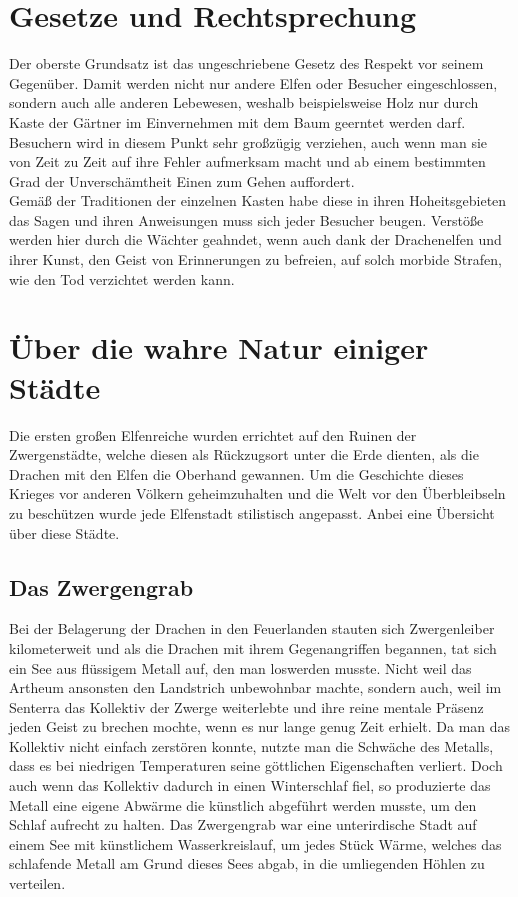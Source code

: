 \documentclass[a4paper,12pt,oneside]{book}
\begin{document}
\chapter{Gesetze und Rechtsprechung}
Der oberste Grundsatz ist das ungeschriebene Gesetz des Respekt vor seinem Gegenüber. Damit werden nicht nur andere Elfen oder Besucher eingeschlossen, sondern auch alle anderen Lebewesen, weshalb beispielsweise Holz nur durch Kaste der Gärtner im Einvernehmen mit dem Baum geerntet werden darf. Besuchern wird in diesem Punkt sehr großzügig verziehen, auch wenn man sie von Zeit zu Zeit auf ihre Fehler aufmerksam macht und ab einem bestimmten Grad der Unverschämtheit Einen zum Gehen auffordert. 
\\Gemäß der Traditionen der einzelnen Kasten habe diese in ihren Hoheitsgebieten das Sagen und ihren Anweisungen muss sich jeder Besucher beugen. Verstöße werden hier durch die Wächter geahndet, wenn auch dank der Drachenelfen und ihrer Kunst, den Geist von Erinnerungen zu befreien, auf solch morbide Strafen, wie den Tod verzichtet werden kann.
\chapter{Über die wahre Natur einiger Städte}
Die ersten großen Elfenreiche wurden errichtet auf den Ruinen der Zwergenstädte, welche diesen als Rückzugsort unter die Erde dienten, als die Drachen mit den Elfen die Oberhand gewannen. Um die Geschichte dieses Krieges vor anderen Völkern geheimzuhalten und die Welt vor den Überbleibseln zu beschützen wurde jede Elfenstadt stilistisch angepasst. Anbei eine Übersicht über diese Städte.
\section{Das Zwergengrab}
Bei der Belagerung der Drachen in den Feuerlanden stauten sich Zwergenleiber kilometerweit und als die Drachen mit ihrem Gegenangriffen begannen, tat sich ein See aus flüssigem Metall auf, den man loswerden musste. Nicht weil das Artheum ansonsten den Landstrich unbewohnbar machte, sondern auch, weil im Senterra das Kollektiv der Zwerge weiterlebte und ihre reine mentale Präsenz jeden Geist zu brechen mochte, wenn es nur lange genug Zeit erhielt. Da man das Kollektiv nicht einfach zerstören konnte, nutzte man die Schwäche des Metalls, dass es bei niedrigen Temperaturen seine göttlichen Eigenschaften verliert. Doch auch wenn das Kollektiv dadurch in einen Winterschlaf fiel, so produzierte das Metall eine eigene Abwärme die künstlich abgeführt werden musste, um den Schlaf aufrecht zu halten. Das Zwergengrab war eine unterirdische Stadt auf einem See mit künstlichem Wasserkreislauf, um jedes Stück Wärme, welches das schlafende Metall am Grund dieses Sees abgab, in die umliegenden Höhlen zu verteilen.
\end{document}
